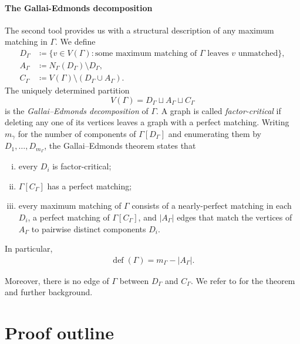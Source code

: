 \documentclass[notitlepage]{scrartcl}
\newcommand{\defi}{\operatorname{def}}
\begin{document}
\paragraph{The Gallai-Edmonds decomposition} \label{s:Gallai}
The second tool provides us with a structural description of any maximum matching in $\Gamma$. We define
\begin{align*}
 D_\Gamma&\coloneqq\{v\in V(\Gamma):\text{some maximum matching of $\Gamma$ leaves $v$ unmatched}\},\\
 A_\Gamma&\coloneqq N_\Gamma(D_\Gamma)\setminus D_\Gamma,\\
 C_\Gamma&\coloneqq V(\Gamma)\setminus(D_\Gamma\cup A_\Gamma).
\end{align*}
The uniquely determined partition
\[
 V(\Gamma)=D_\Gamma\sqcup A_\Gamma\sqcup C_\Gamma
\]
is the \emph{Gallai--Edmonds decomposition} of $\Gamma$.
A graph is called \emph{factor-critical} if deleting any one of its vertices leaves a graph with a perfect matching.
Writing $m_{\gamma}$ for the number of components of $\Gamma[D_\Gamma]$ and enumerating them by $D_1,\ldots,D_{m_\Gamma}$, the Gallai--Edmonds theorem \cite{edmonds1965paths,gallai1964maximale} states that
\begin{enumerate}[(i)]
 \item every $D_i$ is factor-critical;
 \item $\Gamma[C_\Gamma]$ has a perfect matching;
 \item every maximum matching of $\Gamma$ consists of a nearly-perfect matching in each $D_i$, a perfect matching of $\Gamma[C_\Gamma]$, and $|A_\Gamma|$ edges that match the vertices of $A_\Gamma$ to pairwise distinct components $D_i$.
\end{enumerate}
In particular,
\begin{align*} \label{eq:Gallai-Edmonds}
     \defi(\Gamma)=m_\Gamma-|A_\Gamma|.
\end{align*}

Moreover, there is no edge of $\Gamma$ between $D_\Gamma$ and $C_\Gamma$.
We refer to \cite[Chapter~3]{LP86} for the theorem and further background.




\section{Proof outline}\label{s:outline}
\end{document}
